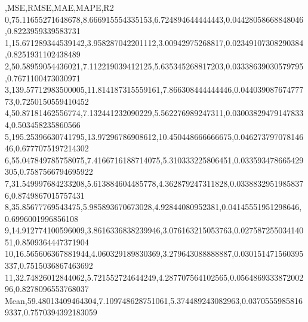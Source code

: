 ,MSE,RMSE,MAE,MAPE,R2
0,75.11655271648678,8.666915554335153,6.724894644444443,0.04428058668848046,0.8223959339583731
1,15.671289344539142,3.958287042201112,3.00942975268817,0.02349107308290384,0.8251931102438489
2,50.58959054436021,7.112219039412125,5.635345268817203,0.03338639030579795,0.7671100473030971
3,139.57712983500005,11.814187315559161,7.866308444444446,0.04403908767477773,0.7250150559410452
4,50.87181462556774,7.132441232090229,5.562276989247311,0.030038294791478334,0.503458235860566
5,195.25396630741795,13.97296786908612,10.450448666666675,0.04627379707814646,0.6777075197214302
6,55.047849785758075,7.4166716188714075,5.310333225806451,0.033593478665429305,0.7587566794695922
7,31.549997684233208,5.613884604485778,4.362879247311828,0.03388329519858376,0.8749867015757431
8,35.85677769543475,5.985893670673028,4.92844080952381,0.04145551951298646,0.6996001996856108
9,14.912774100596009,3.8616336838239946,3.076163215053763,0.02758725503414051,0.8509364447371904
10,16.565606367881944,4.060329189830369,3.279643088888887,0.030151471560395337,0.7515036867463692
11,32.74826012844062,5.721552724644249,4.287707564102565,0.056486933387200296,0.8278096553768037
Mean,59.48013409464304,7.109748628751061,5.374489243082963,0.03705559858169337,0.7570394392183059
